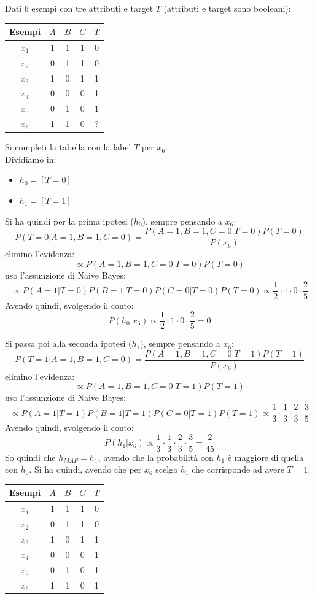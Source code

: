 \documentclass[a4paper,12pt, oneside]{book}
\begin{document}
\begin{esercizio}
  Dati 6 esempi con tre attributi e target $T$ (attributi e target sono
  booleani): 
  \begin{table}[H]
    \centering
    \begin{tabular}{c||c|c|c|c}
      Esempi & $A$ & $B$ & $C$ & $T$\\
      \hline
      \hline
      $x_1$ & 1 & 1 & 1 & 0\\
      $x_2$ & 0 & 1 & 1 & 0\\
      $x_3$ & 1 & 0 & 1 & 1\\
      $x_4$ & 0 & 0 & 0 & 1\\
      $x_5$ & 0 & 1 & 0 & 1\\
      $x_6$ & 1 & 1 & 0 & ?\\
    \end{tabular}
  \end{table}
  Si completi la tabella con la label $T$ per $x_6$.\\
  Dividiamo in:
  \begin{itemize}
    \item $h_0=[T=0]$
    \item $h_1=[T=1]$
  \end{itemize}
  Si ha quindi per la prima ipotesi ($h_0$), sempre pensando a $x_6$:
  \[P(T=0|A=1,B=1,C=0)=\frac{P(A=1,B=1,C=0|T=0)P(T=0)}{P(x_6)}\]
  elimino l'evidenza:
  \[\varpropto P(A=1,B=1,C=0|T=0)P(T=0)\]
  uso l'assunzione di Naive Bayes:
  \[\varpropto P(A=1|T=0)P(B=1|T=0)P(C=0|T=0)P(T=0)
    \varpropto \frac{1}{2}\cdot 1\cdot 0\cdot \frac{2}{5}\]
  Avendo quindi, svolgendo il conto:
  \[P(h_0|x_6)\varpropto  \frac{1}{2}\cdot 1\cdot  0\cdot\frac{2}{5}=0\]
  

  Si passa poi alla seconda ipotesi ($h_1$), sempre pensando a $x_6$:
  \[P(T=1|A=1,B=1,C=0)=\frac{P(A=1,B=1,C=0|T=1)P(T=1)}{P(x_6)}\]
  elimino l'evidenza:
  \[\varpropto P(A=1,B=1,C=0|T=1)P(T=1)\]
  uso l'assunzione di Naive Bayes:
  \[\varpropto P(A=1|T=1)P(B=1|T=1)P(C=0|T=1)P(T=1)
    \varpropto \frac{1}{3}\cdot \frac{1}{3}\cdot \frac{2}{3}\cdot\frac{3}{5}\]
  Avendo quindi, svolgendo il conto:
  \[P(h_1|x_6)\varpropto  \frac{1}{3}\cdot \frac{1}{3}\cdot
    \frac{2}{3}\cdot\frac{3}{5}=\frac{2}{45}\]
  So quindi che $h_{MAP}=h_1$, avendo che la probabilità con $h_1$ è maggiore di
  quella con $h_0$. Si ha quindi, avendo che per $x_6$ scelgo $h_1$ che
  corrisponde ad avere $T=1$:
  \begin{table}[H]
    \centering
    \begin{tabular}{c||c|c|c|c}
      Esempi & $A$ & $B$ & $C$ & $T$\\
      \hline
      \hline
      $x_1$ & 1 & 1 & 1 & 0\\
      $x_2$ & 0 & 1 & 1 & 0\\
      $x_3$ & 1 & 0 & 1 & 1\\
      $x_4$ & 0 & 0 & 0 & 1\\
      $x_5$ & 0 & 1 & 0 & 1\\
      $x_6$ & 1 & 1 & 0 & 1\\
    \end{tabular}
  \end{table}
  

\end{esercizio}
\end{document}
